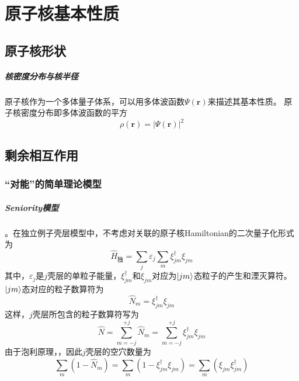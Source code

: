 \chapter{原子核基本性质}

\section{原子核形状}
\paragraph*{核密度分布与核半径}
原子核作为一个多体量子体系，可以用多体波函数$\Psi(\bm{r})$来描述其基本性质。
原子核密度分布即多体波函数的平方
\begin{equation}
    \rho(\bm{r}) = | \Psi(\bm{r}) |^2   \label{eq:nucl.radius}
\end{equation}

\section{剩余相互作用}
\subsection{“对能”的简单理论模型}

\paragraph*{Seniority模型}
。在独立例子壳层模型中，不考虑对关联的原子核Hamiltonian的二次量子化形式为
\begin{equation}
    \hat{H}_{\text{独}}
        = \sum_{j} \varepsilon_j \sum_{m} \xi_{jm}^{\dagger} \xi_{jm}
    \label{eq:indep-hamil}
\end{equation}
其中，$\varepsilon_j$是$j$壳层的单粒子能量，$\xi_{jm}^{\dagger}$和$\xi_{jm}$对应为$\ket{jm}$态粒子的产生和湮灭算符。$\ket{jm}$态对应的粒子数算符为
\begin{equation}
    \hat{N}_{m} = \xi_{jm}^{\dagger} \xi_{jm}
\end{equation}
这样，$j$壳层所包含的粒子数算符写为
\begin{equation}
    \hat{N} = \sum_{m = -j}^{+j} \hat{N}_m
            = \sum_{m = -j}^{+j} \xi_{jm}^{\dagger} \xi_{jm}
\end{equation}
由于泡利原理，，因此$j$壳层的空穴数量为
\begin{equation}
    \sum_{m}(1 - \hat{N}_m) = \sum_{m}(1 -  \xi_{jm}^{\dagger} \xi_{jm} )
                    = \sum_{m}(\xi_{jm} \xi_{jm}^{\dagger} )
\end{equation}

